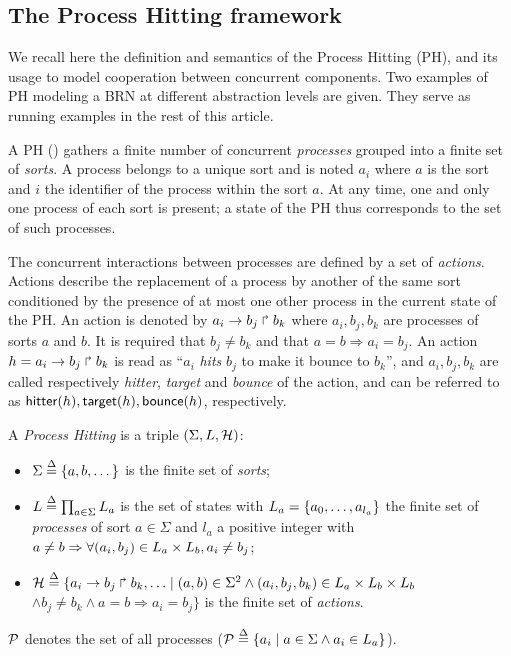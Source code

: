 \subsection{The Process Hitting framework}
\label{ssec:PH}

We recall here the definition and semantics of the Process Hitting (PH), and its usage to model
cooperation between concurrent components.
Two examples of PH modeling a BRN at different abstraction levels are given.
They serve as running examples in the rest of this article.

\medskip

A PH () gathers a finite number of concurrent \emph{processes}
grouped into a finite set of \emph{sorts}.
A process belongs to a unique sort and is noted $a_i$ where $a$ is the
sort and $i$ the identifier of the process within the sort $a$.
At any time, one and only one process of each sort is present; a state of the PH thus corresponds to the set of such processes.
 
The concurrent interactions between processes are defined by a set of
\emph{actions}.
Actions describe the replacement of a process by another of the same sort
conditioned by the presence of at most one other process in the current
state of the PH.
An action is denoted by $a_i\rightarrow b_j\Rsh b_k$ where $a_i,b_j,b_k$ are processes
of sorts $a$ and $b$.
It is required that $b_j\neq b_k$ and that $a=b\Rightarrow a_i=b_j$.
An action $h=a_i\rightarrow b_j\Rsh b_k$ is read as ``$a_i$ \emph{hits} $b_j$ to
make it bounce to $b_k$'', and
$a_i,b_j,b_k$ are called respectively \emph{hitter}, \emph{target} and
\emph{bounce} of the action, and can be referred to as
$\mathsf{hitter}(h), \mathsf{target}(h), \mathsf{bounce}(h)$, respectively.

\begin{definition}\label{def:PH}
A \emph{Process Hitting} is a triple $(\Sigma,L,\mathcal{H})$:
\begin{itemize}
\item $\Sigma \stackrel{\Delta}= \{a,b,\dots\}$ is the finite set of \emph{sorts};
\item $L \stackrel{\Delta}= \prod_{a\in\Sigma} L_a$ is the set of states with $L_a = \{a_0,\dots,a_{l_a}\}$
the finite set of \emph{processes} of sort $a\in\Sigma$ and $l_a$ a positive integer with
	$a\neq b\Rightarrow \forall(a_i,b_j)\in L_a\times L_b,a_i\neq b_j$;
\item $\mathcal{H} \stackrel{\Delta}= \{ a_i\rightarrow b_j\Rsh b_k, \ldots \mid
					(a,b)\in\Sigma^2 \wedge (a_i,b_j,b_k)\in L_a\times L_b\times L_b$ \\
	\hspace*{2cm} $\wedge b_j\neq b_k \wedge a=b\Rightarrow a_i=b_j\}$
			is the finite set of \emph{actions}.
\end{itemize}
$\mathcal{P}$ denotes the set of all processes ($\mathcal{P} \stackrel{\Delta}= \{ a_i\mid a\in\Sigma \wedge a_i\in L_a\}$).
\end{definition}

